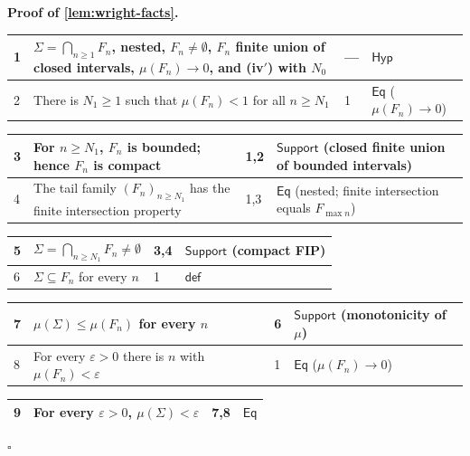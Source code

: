 \documentclass[11pt,reqno]{amsart}
\theoremstyle{blueplain}
\renewcommand{\qedsymbol}{\textcolor{proofqed}{\ensuremath{\square}}}
\renewenvironment{proof}[1][Proof]{\par\noindent\textbf{\textcolor{proofhead}{#1.}}\par\nobreak}{\par\nobreak\hfill\qedsymbol}
\numberwithin{equation}{section}
\begin{document}
\begin{proof}[\textbf{Proof of \cref{lem:wright-facts}}]
	\label{proof:lem:wright-facts}
	{\scriptsize
		\begin{tabular}{|m{0.7cm}|m{12cm}|m{1.4cm}|m{2.5cm}|}
			\hline
			1 & \(\Sigma=\bigcap_{n\ge1}F_n\), nested, \(F_n\ne\emptyset\), \(F_n\) finite union of closed intervals, \(\mu(F_n)\to0\), and (iv$'$) with \(N_0\) & --- & \(\mathsf{Hyp}\) \\ \hline
			2 & There is \(N_1\ge1\) such that \(\mu(F_n)<1\) for all \(n\ge N_1\) & 1 & \(\mathsf{Eq}\) (\(\mu(F_n)\to0\)) \\
		\end{tabular}%
		\noindent \newline
		\noindent
		\begin{tabular}{|m{0.7cm}|m{12cm}|m{1.4cm}|m{2.5cm}|}
			\hline
			3 & For \(n\ge N_1\), \(F_n\) is bounded; hence \(F_n\) is compact & 1,2 & \(\mathsf{Support}\) (closed finite union of bounded intervals) \\ \hline
			4 & The tail family \((F_n)_{n\ge N_1}\) has the finite intersection property & 1,3 & \(\mathsf{Eq}\) (nested; finite intersection equals \(F_{\max n}\)) \\
		\end{tabular}%
		\noindent \newline
		\noindent
		\begin{tabular}{|m{0.7cm}|m{12cm}|m{1.4cm}|m{2.5cm}|}
			\hline
			5 & \(\Sigma=\bigcap_{n\ge N_1}F_n\ne\emptyset\) & 3,4 & \(\mathsf{Support}\) (compact FIP) \\ \hline
			6 & \(\Sigma\subseteq F_n\) for every \(n\) & 1 & \(\mathsf{def}\) \\
		\end{tabular}%
		\noindent \newline
		\noindent
		\begin{tabular}{|m{0.7cm}|m{12cm}|m{1.4cm}|m{2.5cm}|}
			\hline
			7 & \(\mu(\Sigma)\le\mu(F_n)\) for every \(n\) & 6 & \(\mathsf{Support}\) (monotonicity of \(\mu\)) \\ \hline
			8 & For every \(\varepsilon>0\) there is \(n\) with \(\mu(F_n)<\varepsilon\) & 1 & \(\mathsf{Eq}\) (\(\mu(F_n)\to0\)) \\
		\end{tabular}%
		\noindent \newline
		\noindent
		\begin{tabular}{|m{0.7cm}|m{12cm}|m{1.4cm}|m{2.5cm}|}
			\hline
			9 & For every \(\varepsilon>0\), \(\mu(\Sigma)<\varepsilon\) & 7,8 & \(\mathsf{Eq}\) \\ \hline

\end{tabular}}
\end{proof}
\end{document}
